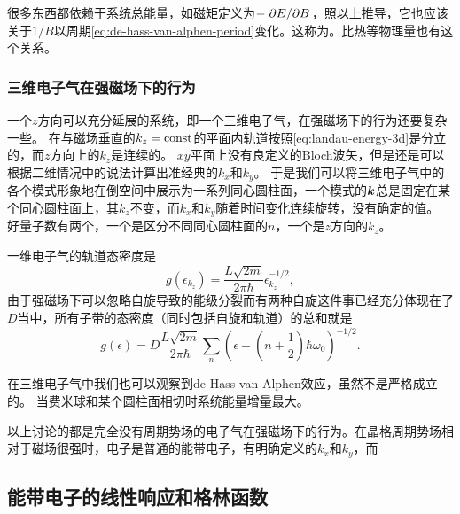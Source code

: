 很多东西都依赖于系统总能量，如磁矩定义为$- \pdv*{E}{B}$，照以上推导，它也应该关于$1/B$以周期\eqref{eq:de-hass-van-alphen-period}变化。这称为。比热等物理量也有这个关系。


\subsubsection{三维电子气在强磁场下的行为}

一个$z$方向可以充分延展的系统，即一个三维电子气，在强磁场下的行为还要复杂一些。
在与磁场垂直的$k_z=\mathrm{const}$的平面内轨道按照\eqref{eq:landau-energy-3d}是分立的，而$z$方向上的$k_z$是连续的。
$xy$平面上没有良定义的Bloch波矢，但是还是可以根据二维情况中的说法计算出准经典的$k_x$和$k_y$。
于是我们可以将三维电子气中的各个模式形象地在倒空间中展示为一系列同心圆柱面，一个模式的$\vb*{k}$总是固定在某个同心圆柱面上，其$k_z$不变，而$k_x$和$k_y$随着时间变化连续旋转，没有确定的值。
好量子数有两个，一个是区分不同同心圆柱面的$n$，一个是$z$方向的$k_z$。

一维电子气的轨道态密度是
\begin{equation}
    g(\epsilon_{k_z}) = \frac{L \sqrt{2m}}{2 \pi \hbar} \epsilon_{k_z}^{-1/2},
\end{equation}
由于强磁场下可以忽略自旋导致的能级分裂而有两种自旋这件事已经充分体现在了$D$当中，所有子带的态密度（同时包括自旋和轨道）的总和就是
\begin{equation}
    g(\epsilon) = D \frac{L \sqrt{2m}}{2 \pi \hbar} \sum_n \left(\epsilon - \left( n + \frac{1}{2} \right) \hbar \omega_0 \right)^{-1/2}.
\end{equation}

在三维电子气中我们也可以观察到de Hass-van Alphen效应，虽然不是严格成立的。
当费米球和某个圆柱面相切时系统能量增量最大。

以上讨论的都是完全没有周期势场的电子气在强磁场下的行为。在晶格周期势场相对于磁场很强时，电子是普通的能带电子，有明确定义的$k_x$和$k_y$，而

\subsection{能带电子的线性响应和格林函数}\label{sec:linear-response-energy-band}

